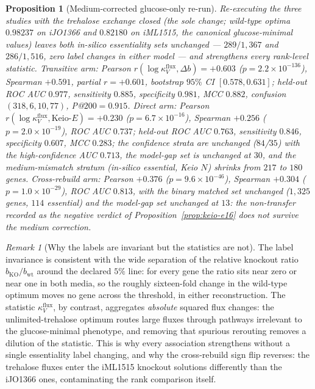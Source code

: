 \documentclass[11pt,a4paper]{article}
\theoremstyle{plain}
\newtheorem{proposition}[theorem]{Proposition}
\theoremstyle{definition}
\theoremstyle{remark}
\newtheorem{remark}[theorem]{Remark}
\begin{document}
\begin{proposition}[Medium-corrected glucose-only re-run]
\label{prop:keio-glucose-only}
Re-executing the three studies with the trehalose exchange closed
(the sole change; wild-type optima $0.98237$ on iJO1366 and
$0.82180$ on iML1515, the canonical glucose-minimal values) leaves
both in-silico essentiality sets unchanged --- $289/1{,}367$ and
$286/1{,}516$, zero label changes in either model --- and
strengthens every rank-level statistic. Transitive arm: Pearson
$r(\log\kappa^{\mathrm{flux}}_V,\Delta b)=+0.603$
($p=2.2\times10^{-136}$), Spearman $+0.591$, partial $r=+0.601$,
bootstrap $95\%$ CI $[0.578,0.631]$; held-out ROC AUC $0.977$,
sensitivity $0.885$, specificity $0.981$, MCC $0.882$, confusion
$(318,6,10,77)$, P@$200=0.915$. Direct arm: Pearson
$r(\log\kappa^{\mathrm{flux}}_V,\mathrm{Keio}\text{-}E)=+0.230$
($p=6.7\times10^{-16}$), Spearman $+0.256$
($p=2.0\times10^{-19}$), ROC AUC $0.737$; held-out ROC AUC
$0.763$, sensitivity $0.846$, specificity $0.607$, MCC $0.283$;
the confidence strata are unchanged ($84$/$35$) with the
high-confidence AUC $0.713$, the model-gap set is unchanged at
$30$, and the medium-mismatch stratum (in-silico essential, Keio
$N$) shrinks from $217$ to $180$ genes. Cross-rebuild arm: Pearson
$+0.376$ ($p=9.6\times10^{-46}$), Spearman $+0.304$
($p=1.0\times10^{-29}$), ROC AUC $0.813$, with the binary matched
set unchanged ($1{,}325$ genes, $114$ essential) and the model-gap
set unchanged at $13$: the non-transfer recorded as the negative
verdict of Proposition~\ref{prop:keio-e16} does not survive the
medium correction.
\end{proposition}

\begin{remark}[Why the labels are invariant but the statistics are not]
\label{rem:keio-invariance}
The label invariance is consistent with the wide separation of the
relative knockout ratio $b_{\mathrm{KO}}/b_{\mathrm{wt}}$ around the
declared $5\%$ line: for every gene the ratio sits near zero or near
one in both media, so the roughly sixteen-fold change in the
wild-type optimum moves no gene across the threshold, in either
reconstruction. The statistic $\kappa^{\mathrm{flux}}_V$, by
contrast, aggregates \emph{absolute} squared flux changes: the
unlimited-trehalose optimum routes large fluxes through pathways
irrelevant to the glucose-minimal phenotype, and removing that
spurious rerouting removes a dilution of the statistic. This is why
every association strengthens without a single essentiality label
changing, and why the cross-rebuild sign flip reverses: the
trehalose fluxes enter the iML1515 knockout solutions differently
than the iJO1366 ones, contaminating the rank comparison itself.
\end{remark}
\end{document}

